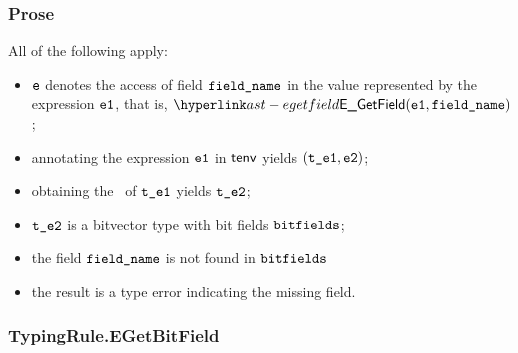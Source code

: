 \subsubsection{Prose}
All of the following apply:
\begin{itemize}
  \item $\ve$ denotes the access of field $\fieldname$ in the value represented by the expression $\veone$, that is, $\EGetField(\veone, \fieldname)$;
  \item annotating the expression $\veone$ in $\tenv$ yields $(\vteone, \vetwo)$\ProseOrTypeError;
  \item obtaining the \underlyingtype\ of $\vteone$ yields $\vtetwo$\ProseOrTypeError;
  \item $\vtetwo$ is a bitvector type with bit fields $\bitfields$;
  \item the field $\fieldname$ is not found in $\bitfields$
  \item the result is a type error indicating the missing field.
\end{itemize}
\begin{mathpar}
\end{mathpar}

\subsubsection{TypingRule.EGetBitField \label{sec:TypingRule.EGetBitField}}
